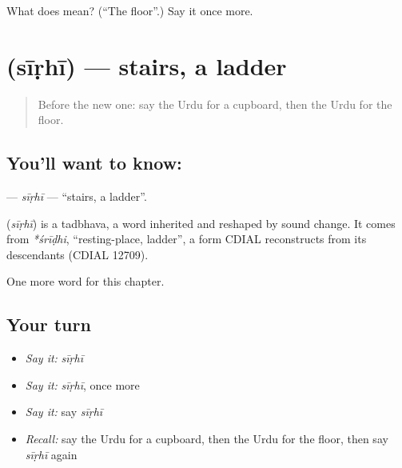 \begin{tcolorbox}[breakable,colback=teal!4,colframe=teal!35!black,title={Before you move on}]
What does  mean? (\textquotedblleft{}The floor\textquotedblright{}.) Say it once more.
\end{tcolorbox}
\section[\texorpdfstring{\ur{سیڑھی} (sīṛhī)}{سیڑھی (sīṛhī)}]{ (sīṛhī) — stairs, a ladder}

\label{lesson:UR-C59-sirhi}



\begin{quote}
Before the new one: say the Urdu for a cupboard, then the Urdu for the floor.
\end{quote}

\subsection*{You'll want to know: }
\textbf{} — \emph{sīṛhī} — \textquotedblleft{}stairs, a ladder\textquotedblright{}.

\begin{cousinweb}
\textbf{} (\emph{sīṛhī}) is a tadbhava, a word inherited and reshaped by sound change. It comes from \emph{*śrīḍhi}, \textquotedblleft{}resting-place, ladder\textquotedblright{}, a form CDIAL reconstructs from its descendants (CDIAL 12709).
\end{cousinweb}

\begin{grammarlens}[title={What you've built}]
One more word for this chapter.
\end{grammarlens}

\subsection*{Your turn}
\begin{itemize}
\raggedright
  \item \emph{Say it:} \emph{sīṛhī}
  \item \emph{Say it:} \emph{sīṛhī}, once more
  \item \emph{Say it:} say \emph{sīṛhī}
  \item \emph{Recall:} say the Urdu for a cupboard, then the Urdu for the floor, then say \emph{sīṛhī} again
\end{itemize}

